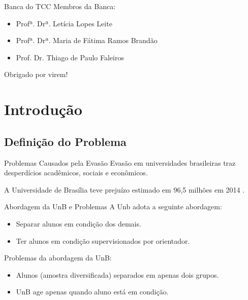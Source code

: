 \begin{frame}{Banca do TCC}
    Membros da Banca: 
    \begin{itemize}
        \item Profª. Drª. Letícia Lopes Leite
        \item Profª. Drª. Maria de Fátima Ramos Brandão
        \item Prof. Dr. Thiago de Paulo Faleiros
    \end{itemize}
    \vspace{0.5cm}
    Obrigado por virem!
\end{frame}

\section{Introdução}
\subsection{Definição do Problema}
\begin{frame}{Problemas Causados pela Evasão}
    Evasão em universidades brasileiras traz desperdícios acadêmicos, sociais e
    econômicos.  

    \vspace{0.5cm}

    A Universidade de Brasília teve prejuízo estimado em 96,5 milhões em 2014
    \cite{correio}.
\end{frame}

\begin{frame}{Abordagem da UnB e Problemas}
    A Unb adota a seguinte abordagem: 
    \begin{itemize}
        \item Separar alunos em condição dos demais.
        \item Ter alunos em condição supervisionados por orientador. 
    \end{itemize}

    \vspace{0.5cm}

    Problemas da abordagem da UnB: 
    \begin{itemize}
        \item Alunos (amostra diversificada) separados em apenas dois grupos.
        \item UnB age apenas quando aluno está em condição.
    \end{itemize}
\end{frame}


